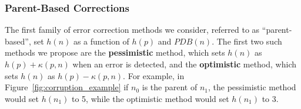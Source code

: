 \documentclass{article}
\begin{document}





\subsubsection{Parent-Based Corrections}
The first family of error correction methods we consider, referred to as ``parent-based'', set $h(n)$ as a function of $h(p)$ and $PDB(n)$. 
The first two such methods we propose are the \textbf{pessimistic} method, which sets $h(n)$ as $h(p) + \kappa(p, n)$ when an error is detected, and the \textbf{optimistic} method, which sets $h(n)$ as $h(p) - \kappa(p, n)$. For example, in Figure~\ref{fig:corruption_example} if $n_0$ is the parent of $n_1$, the pessimistic method would set $h(n_1)$ to 5, while the optimistic method would set $h(n_1)$ to 3.

%
%
\end{document}

